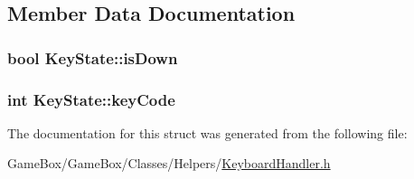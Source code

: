 \subsection{\-Member \-Data \-Documentation}
\hypertarget{struct_key_state_a8922b61cb789c21713c4baceca7ee9ae}{
\subsubsection[{is\-Down}]{\setlength{\rightskip}{0pt plus 5cm}bool {\bf \-Key\-State\-::is\-Down}}}\label{struct_key_state_a8922b61cb789c21713c4baceca7ee9ae}
\hypertarget{struct_key_state_a8240c9d70dd2e47832fe50e40e4adce9}{
\subsubsection[{key\-Code}]{\setlength{\rightskip}{0pt plus 5cm}int {\bf \-Key\-State\-::key\-Code}}}\label{struct_key_state_a8240c9d70dd2e47832fe50e40e4adce9}


\-The documentation for this struct was generated from the following file\-:\begin{DoxyCompactItemize}
\item 
\-Game\-Box/\-Game\-Box/\-Classes/\-Helpers/\hyperlink{_keyboard_handler_8h}{\-Keyboard\-Handler.\-h}\end{DoxyCompactItemize}
